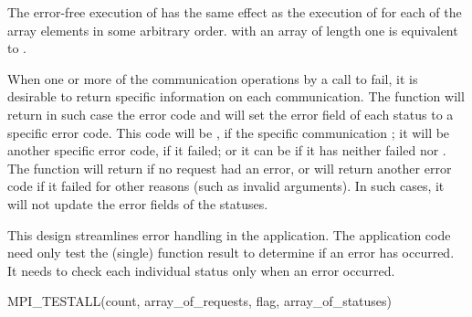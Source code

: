 The error-free execution of
has the same effect as the execution of
for each of the array elements
in some arbitrary order.
 with an array of length one
is equivalent to .

When one or more of the communication operations  by a
call to  fail, it is
desirable to return specific information on each
communication.  The function  will return in such
case the error code  and will set the
error field of each status to a specific error code.  This code will be
, if the specific communication ; it will
be another specific error code, if it failed;
or it can be  if it has neither failed nor .
The function  will return  if no request
had an error,
or will return another error code if it failed
for other reasons (such as invalid arguments).  In such cases, it will
not update the error fields of the statuses.

\begin{rationale}
This design streamlines error handling in the application.
The application code need only test the (single) function result to
determine if an error has occurred.  It needs to check each individual
status only when an error occurred.
\end{rationale}

\begin{funcdef}{MPI\_TESTALL}{(\mbox{count}, \mbox{array\_of\_requests}, \mbox{flag}, \mbox{array\_of\_statuses})}
\end{funcdef}

